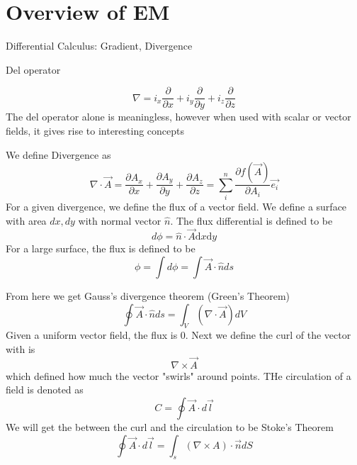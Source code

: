 \chapter{Overview of EM}

\begin{remark}
    Differential Calculus: Gradient, Divergence 

    \begin{definition}
        Del operator

        \[
            \nabla = i_x \frac{\partial }{\partial x} + i_y \frac{\partial }{\partial y}  
            + i_z\frac{\partial }{\partial z} 
        \]
        The del operator alone is meaningless, however when used with scalar or vector fields,
        it gives rise to interesting concepts
    \end{definition}

    \begin{definition}
        We define Divergence as 
    \[
        \nabla \cdot \vec{A} = \frac{\partial A_x}{\partial x} + \frac{\partial A_y}{\partial y}
        + \frac{\partial A_z}{\partial z} = 
        \sum_{i}^n \frac{\partial f(\vec{A} )}{\partial A_i}  \vec{e_i} 
    \]
    For a given divergence, we define the flux of a vector field. We define a surface with area 
    \(dx, dy\) with normal vector \(\hat{n}\). The flux differential is defined to be 
    \[
        d \phi  = \hat{n}  \cdot \vec{A} \mathrm{d}x  \mathrm{d}y    
    \]  
    For a large surface, the flux is defined to be 
    \[
        \phi  = \int d \phi  = \int  \vec{A}  \cdot \hat{n}  ds
    \]
        
    \end{definition}

    From here we get Gauss's divergence theorem (Green's Theorem)
    \[
        \oint  \vec{A}  \cdot \hat{n} ds = \int_V (\nabla \cdot \vec{A} ) dV 
    \]
    Given a uniform vector field, the flux is 0.
    Next we define the curl of the vector with is 
    \[
        {\nabla} \times \vec{A} 
    \]
    which defined how much the vector "swirls" around points. THe circulation of a field is denoted as 
    \[
        C= \oint \vec{A} \cdot d \vec{l}  
    \]
    We will get the between the curl and the circulation to be Stoke's Theorem
    \[
        \oint \vec{A} \cdot d\vec{l} = \int _s (\nabla \times A ) \cdot \vec{n} dS
    \]
\end{remark}

